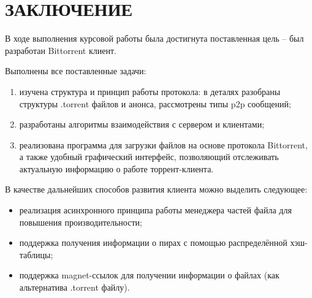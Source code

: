 \section*{ЗАКЛЮЧЕНИЕ}

В ходе выполнения курсовой работы была достигнута поставленная цель -- был разработан Bittorrent клиент.

Выполнены все поставленные задачи:
\begin{enumerate}
	\item изучена структура и принцип работы протокола: в деталях разобраны структуры .torrent файлов и анонса, рассмотрены типы p2p сообщений;
	
	\item разработаны алгоритмы взаимодействия с сервером и клиентами;
	
	\item реализована программа для загрузки файлов на основе протокола Bittorrent, а также удобный графический интерфейс, позволяющий отслеживать актуальную информацию о работе торрент-клиента.
\end{enumerate}

В качестве дальнейших способов развития клиента можно выделить следующее:
\begin{itemize}
	\item реализация асинхронного принципа работы менеджера частей файла для повышения производительности;
	\item поддержка получения информации о пирах с помощью распределённой хэш-таблицы;
	\item поддержка magnet-ссылок для получении информации о файлах (как альтернатива .torrent файлу).
\end{itemize}
